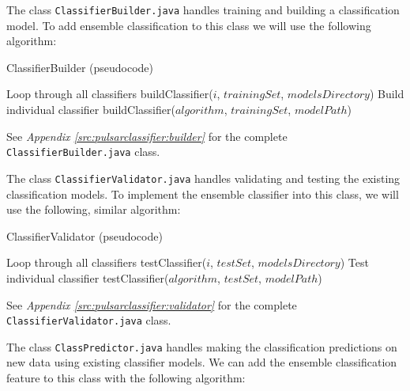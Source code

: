 \documentclass{article}
\begin{document}
\begin{appendices}
\begin{subappendices}
The class \verb|ClassifierBuilder.java| handles training and building a classification model. To add ensemble classification to this class we will use the following algorithm:

\begin{algorithm}[H]
    \caption{ClassifierBuilder (pseudocode)}
    \begin{algorithmic}[1]
                \Comment Loop through all classifiers
                \State buildClassifier($i$, $trainingSet$, $modelsDirectory$)
            \EndFor
        \Else 
            \Comment Build individual classifier
            \State buildClassifier($algorithm$, $trainingSet$, $modelPath$)
            
        \EndIf
        
    \end{algorithmic}
\end{algorithm}

See \emph{Appendix \ref{src:pulsarclassifier:builder}} for the complete \verb|ClassifierBuilder.java| class. 

The class \verb|ClassifierValidator.java| handles validating and testing the existing classification models. To implement the ensemble classifier into this class, we will use the following, similar algorithm:

\begin{algorithm}[H]
    \caption{ClassifierValidator (pseudocode)}
    \begin{algorithmic}[1]
                \Comment Loop through all classifiers
                \State testClassifier($i$, $testSet$, $modelsDirectory$)
            \EndFor
        \Else 
            \Comment Test individual classifier
            \State testClassifier($algorithm$, $testSet$, $modelPath$)
        \EndIf
        
    \end{algorithmic}
\end{algorithm}

See \emph{Appendix \ref{src:pulsarclassifier:validator}} for the complete \verb|ClassifierValidator.java| class. 

The class \verb|ClassPredictor.java| handles making the classification predictions on new data using existing classifier models. We can add the ensemble classification feature to this class with the following algorithm:


\end{subappendices}
\end{appendices}
\end{document}
